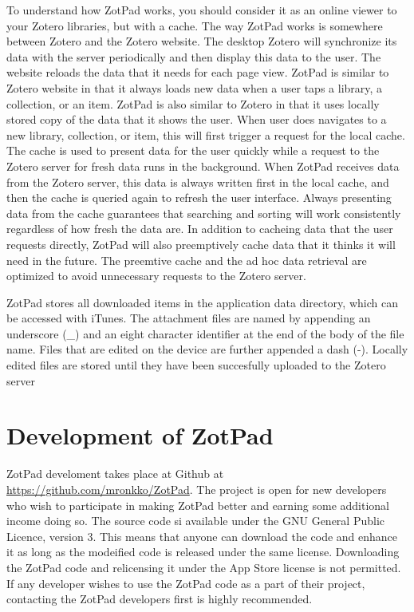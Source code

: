 \documentclass[oneside, openany, 12pt]{tufte-book}
\begin{document}
To understand how ZotPad works, you should consider it as an online viewer to your Zotero libraries, but with a cache. The way ZotPad works is somewhere between Zotero and the Zotero website. The desktop Zotero will synchronize its data with the server periodically and then display this data to the user. The website reloads the data that it needs for each page view. ZotPad is similar to Zotero website in that it always loads new data when a user taps a library, a collection, or an item. ZotPad is also similar to Zotero in that it uses locally stored copy of the data that it shows the user. When user does navigates to a new library, collection, or item, this will first trigger a request for the local cache. The cache is used to present data for the user quickly while a request to the Zotero server for fresh data runs in the background. When ZotPad receives data from the Zotero server, this data is always written first in the local cache, and then the cache is queried again to refresh the user interface. Always presenting data from the cache guarantees that searching and sorting will work consistently regardless of how fresh the data are. In addition to cacheing data that the user requests directly, ZotPad will also preemptively cache data that it thinks it will need in the future. The preemtive cache and the ad hoc data retrieval are optimized to avoid unnecessary requests to the Zotero server. 

ZotPad stores all downloaded items in the application data directory, which can be accessed with iTunes. The attachment files are named by appending an underscore (\_) and an eight character identifier at the end of the body of the file name. Files that are edited on the device are further appended a dash (-). Locally edited files are stored until they have been succesfully uploaded to the Zotero server

	\section{Development of ZotPad}
	
ZotPad develoment takes place at Github at \url{https://github.com/mronkko/ZotPad}. The project is open for new developers who wish to participate in making ZotPad better and earning some additional income doing so. The source code si available under the GNU General Public Licence, version 3. This means that anyone can download the code and enhance it as long as the modeified code is released under the same license. Downloading the ZotPad code and relicensing it under the App Store license is not permitted. If any developer wishes to use the ZotPad code as a part of their project, contacting the ZotPad developers first is highly recommended.
\end{document}
